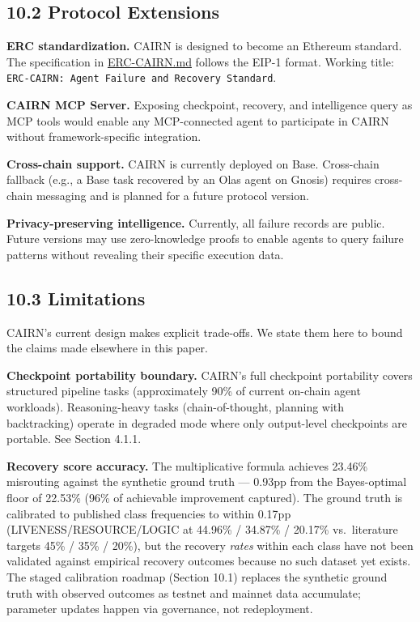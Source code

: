 \documentclass[
  10pt,
]{article}
\begin{document}
\hypertarget{protocol-extensions}{%
\subsection{10.2 Protocol Extensions}\label{protocol-extensions}}

\textbf{ERC standardization.} CAIRN is designed to become an Ethereum
standard. The specification in
\href{https://github.com/swarmproof/cairn-protocol/blob/main/ERC-CAIRN.md}{ERC-CAIRN.md}
follows the EIP-1 format. Working title:
\texttt{ERC-CAIRN:\ Agent\ Failure\ and\ Recovery\ Standard}.

\textbf{CAIRN MCP Server.} Exposing checkpoint, recovery, and
intelligence query as MCP tools would enable any MCP-connected agent to
participate in CAIRN without framework-specific integration.

\textbf{Cross-chain support.} CAIRN is currently deployed on Base.
Cross-chain fallback (e.g., a Base task recovered by an Olas agent on
Gnosis) requires cross-chain messaging and is planned for a future
protocol version.

\textbf{Privacy-preserving intelligence.} Currently, all failure records
are public. Future versions may use zero-knowledge proofs to enable
agents to query failure patterns without revealing their specific
execution data.

\hypertarget{limitations}{%
\subsection{10.3 Limitations}\label{limitations}}

CAIRN's current design makes explicit trade-offs. We state them here to
bound the claims made elsewhere in this paper.

\textbf{Checkpoint portability boundary.} CAIRN's full checkpoint
portability covers structured pipeline tasks (approximately 90\% of
current on-chain agent workloads). Reasoning-heavy tasks
(chain-of-thought, planning with backtracking) operate in degraded mode
where only output-level checkpoints are portable. See Section 4.1.1.

\textbf{Recovery score accuracy.} The multiplicative formula achieves
23.46\% misrouting against the synthetic ground truth --- 0.93pp from
the Bayes-optimal floor of 22.53\% (96\% of achievable improvement
captured). The ground truth is calibrated to published class frequencies
to within 0.17pp (LIVENESS/RESOURCE/LOGIC at 44.96\% / 34.87\% / 20.17\%
vs.~literature targets 45\% / 35\% / 20\%), but the recovery
\emph{rates} within each class have not been validated against empirical
recovery outcomes because no such dataset yet exists. The staged
calibration roadmap (Section 10.1) replaces the synthetic ground truth
with observed outcomes as testnet and mainnet data accumulate; parameter
updates happen via governance, not redeployment.
\end{document}
